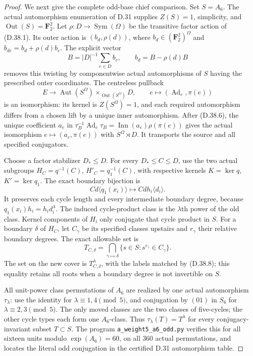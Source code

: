 \begin{proof}
We next give the complete odd-base chief comparison.  Set \(S=A_6\).
The actual automorphism enumeration of D.31 supplies
\(Z(S)=1\), simplicity, and
\(\operatorname{Out}(S)=\mathbf F_2^2\).
Let \(\rho:D\to\operatorname{Sym}(\Omega)\) be the transitive
factor action of \textup{(D.38.1)}.  Its outer action is
\((b_d,\rho(d))\), where
\(b_d\in(\mathbf F_2^2)^\Omega\) and
\(b_{de}=b_d+\rho(d)b_e\).
The explicit vector
\[
 B=|D|^{-1}\sum_{e\in D}b_e,
       \qquad b_d=B-\rho(d)B
 \tag{D.38.6}
\]
removes this twisting by componentwise actual automorphisms of
\(S\) having the prescribed outer coordinates.
The centreless pullback
\[
 E\longrightarrow
 \operatorname{Aut}(S^\Omega)
       \times_{\operatorname{Out}(S^\Omega)}D,
 \qquad e\longmapsto(\operatorname{Ad}_e,\pi(e))
 \tag{D.38.7}
\]
is an isomorphism: its kernel is \(Z(S^\Omega)=1\), and each
required automorphism differs from a chosen lift by a unique
inner automorphism.  After \textup{(D.38.6)}, the unique
coefficient \(a_e\) in
\(\tau_B^{-1}\operatorname{Ad}_e\tau_B
 =\operatorname{Inn}(a_e)\rho(\pi(e))\)
gives the actual isomorphism
\(e\mapsto(a_e,\pi(e))\) with \(S^\Omega\rtimes D\).
It transports the source and all specified conjugators.

Choose a factor stabilizer \(D_*\leq D\).
For every \(D_*\leq C\leq D\), use the two actual subgroups
\(H_C=q^{-1}(C)\), \(H'_C=q_1^{-1}(C)\), with respective
kernels \(K=\ker q\), \(K'=\ker q_1\).
The exact boundary bijection is
\[
 C d\langle q_1(x_i)\rangle
       \longmapsto C d h_i\langle d_i\rangle.
 \tag{D.38.8}
\]
It preserves each cycle length and every intermediate boundary
degree, because \(q_1(x_i)h_i=h_i d_i^\lambda\).
The induced cycle-product class is the \(\lambda\)th power
of the old class.  Kernel components of \(H_i\) only conjugate
that cycle product in \(S\).
For a boundary \(\delta\) of \(H_C\), let \(C_\gamma\)
be its specified classes upstairs and \(r_\gamma\) their
relative boundary degrees.  The exact allowable set is
\[
 T_{C,\delta}=
    \bigcap_{\gamma\mapsto\delta}
       \{s\in S:s^{r_\gamma}\in C_\gamma\}.
 \tag{D.38.9}
\]
The set on the new cover is \(T_{C,\delta}^\lambda\), with
the labels matched by \textup{(D.38.8)}; this equality retains
all roots when a boundary degree is not invertible on \(S\).

All unit-power class permutations of \(A_6\) are realized by
one actual automorphism \(\tau_\lambda\): use the identity
for \(\lambda\equiv1,4\pmod5\), and conjugation by \((01)\)
in \(S_6\) for \(\lambda\equiv2,3\pmod5\).
The only moved classes are the two classes of five-cycles;
the other cycle types each form one \(A_6\)-class.
Thus \(\tau_\lambda(T)=T^\lambda\) for every conjugacy-invariant
subset \(T\subset S\).
The program \texttt{a\_weight5\_a6\_odd.py} verifies this for
all sixteen units modulo \(\exp(A_6)=60\), on all 360 actual
permutations, and locates the literal odd conjugation in the
certified D.31 automorphism table.


\end{proof}
